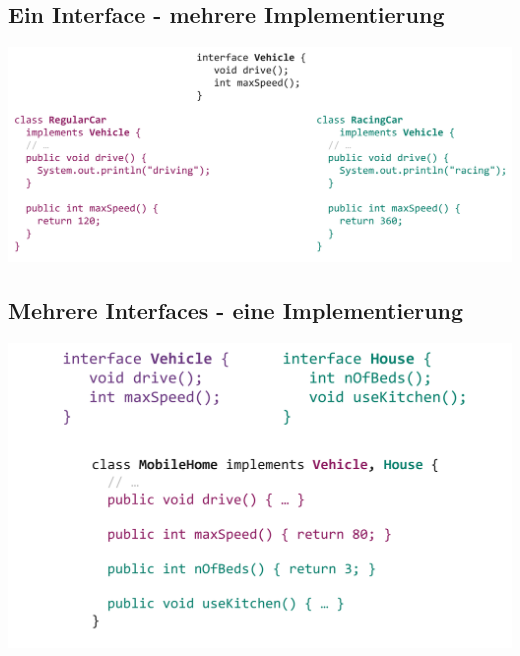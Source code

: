 \subsection{Ein Interface - mehrere Implementierung}
\begin{center}
    \includegraphics[width=0.9\columnwidth]{pictures/interface1-class2.png}
\end{center}

\subsection{Mehrere Interfaces - eine Implementierung}
\begin{center}
    \includegraphics[width=0.9\columnwidth]{pictures/interface2-class1.png}
\end{center}
